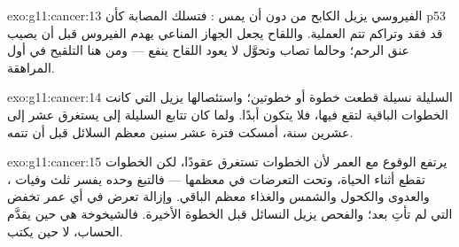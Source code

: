 \begin{solution}{exo:g11:cancer:13}
 الفيروسي يزيل الكابح من دون أن يمس : فتسلك 
المصابة كأن p53 قد فقد وتراكم  تتم العملية. واللقاح يجعل الجهاز
المناعي يهدم الفيروس قبل أن يصيب عنق الرحم؛ وحالما تصاب  وتحوَّل
لا يعود اللقاح ينفع --- ومن هنا التلقيح في أول المراهقة.
\end{solution}

\begin{solution}{exo:g11:cancer:14}
السليلة نسيلة قطعت خطوة أو خطوتين؛ واستئصالها يزيل  التي كانت
الخطوات الباقية لتقع فيها، فلا يتكون  أبدًا. ولما كان تتابع
السليلة إلى  يستغرق عشر إلى عشرين سنة، أمسكت فترة عشر سنين
معظم السلائل قبل أن تتمه.
\end{solution}

\begin{solution}{exo:g11:cancer:15}
يرتفع الوقوع مع العمر لأن الخطوات تستغرق عقودًا، لكن الخطوات تقطع
أثناء الحياة، وتحت التعرضات في معظمها --- فالتبغ وحده يفسر ثلث وفيات
، والعدوى والكحول والشمس والغذاء معظم الباقي. وإزالة تعرض في أي
عمر تخفض  التي لم تأتِ بعد؛ والفحص يزيل النسائل قبل الخطوة
الأخيرة. فالشيخوخة هي حين يقدَّم الحساب، لا حين يكتب.
\end{solution}

